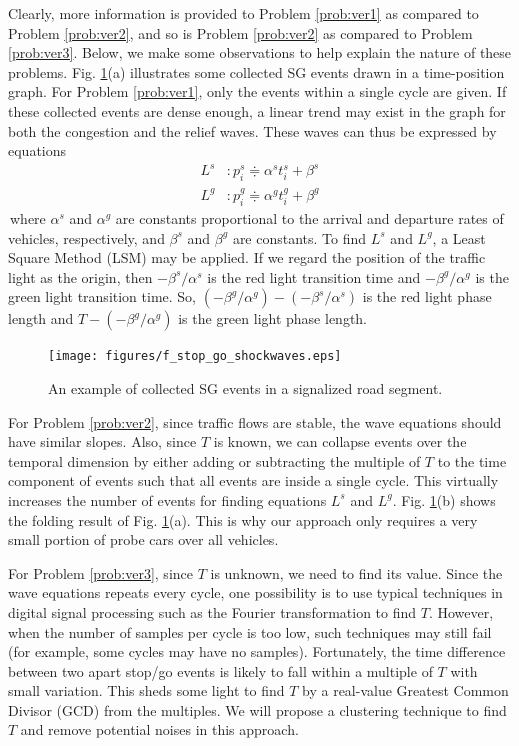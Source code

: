 \documentclass[final,oneside,onecolumn,12pt,a4paper]{book}%
\begin{document}
Clearly, more information is provided to Problem \ref{prob:ver1} as compared
to Problem \ref{prob:ver2}, and so is Problem \ref{prob:ver2} as compared to
Problem \ref{prob:ver3}. Below, we make some observations to help explain the
nature of these problems. Fig. \ref{fig:SG_shockwaves}(a) illustrates some
collected SG events drawn in a time-position graph. For Problem
\ref{prob:ver1}, only the events within a single cycle are given. If these
collected events are dense enough, a linear trend may exist in the graph for
both the congestion and the relief waves. These waves can thus be expressed by
equations
\begin{align*}
L^{s}  &  :p_{i}^{s}\doteqdot\alpha^{s}t_{i}^{s}+\beta^{s}\\
L^{g}  &  :p_{i}^{g}\doteqdot\alpha^{g}t_{i}^{g}+\beta^{g}%
\end{align*}
$\frac{{}}{{}}$where $\alpha^{s}$ and $\alpha^{g}$ are constants proportional
to the arrival and departure rates of vehicles, respectively, and $\beta^{s}$
and $\beta^{g}$ are constants. To find $L^{s}$ and $L^{g}$, a Least Square
Method (LSM) may be applied. If we regard the position of the traffic light as
the origin, then $-\beta^{s}/\alpha^{s}$ is the red light transition time and
$-\beta^{g}/\alpha^{g}$ is the green light transition time. So, $\left(
-\beta^{g}/\alpha^{g}\right)  -\left(  -\beta^{s}/\alpha^{s}\right)  $ is the
red light phase length and $T-\left(  -\beta^{g}/\alpha^{g}\right)  $ is the
green light phase length.\begin{figure}[pth]
\centerline{\texttt{[image: figures/f\_stop\_go\_shockwaves.eps]}} \hfill\caption{An example of collected SG
events in a signalized road segment.}%
\label{fig:SG_shockwaves}%
\end{figure}

For Problem \ref{prob:ver2}, since traffic flows are stable, the wave
equations should have similar slopes. Also, since $T$ is known, we can
collapse events over the temporal dimension by either adding or subtracting
the multiple of $T$ to the time component of events such that all events are
inside a single cycle. This virtually increases the number of events for
finding equations $L^{s}$ and $L^{g}$. Fig. \ref{fig:SG_shockwaves}(b) shows
the folding result of Fig. \ref{fig:SG_shockwaves}(a). This is why our
approach only requires a very small portion of probe cars over all vehicles.

For Problem \ref{prob:ver3}, since $T$ is unknown, we need to find its value.
Since the wave equations repeats every cycle, one possibility is to use
typical techniques in digital signal processing such as the Fourier
transformation to find $T$. However, when the number of samples per cycle is
too low, such techniques may still fail (for example, some cycles may have no
samples). Fortunately, the time difference between two apart stop/go events is
likely to fall within a multiple of $T$ with small variation. This sheds some
light to find $T$ by a real-value Greatest Common Divisor (GCD) from the
multiples. We will propose a clustering technique to find $T$ and remove
potential noises in this approach.
\end{document}
